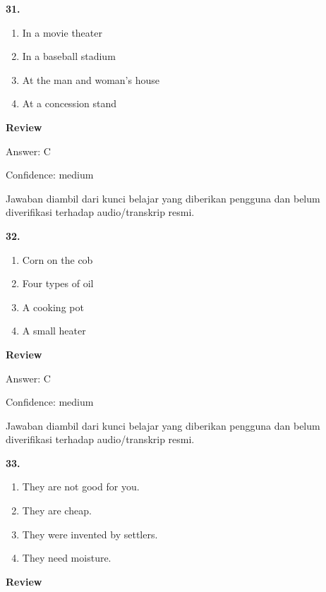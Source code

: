 \documentclass[12pt]{article}
\begin{document}
\noindent\textbf{31.}
\begin{enumerate}[label=(\Alph*),leftmargin=*,itemsep=0.2em]
\item In a movie theater
\item In a baseball stadium
\item At the man and woman's house
\item At a concession stand
\end{enumerate}
\par
\begingroup
\setlength{\parskip}{0pt}
\setlength{\parindent}{0pt}
\textbf{Review}\par
Answer: C\par
Confidence: medium\par
Jawaban diambil dari kunci belajar yang diberikan pengguna dan belum diverifikasi terhadap audio/transkrip resmi.\par
\endgroup
\par
\vspace{0.25\baselineskip}
\noindent\textbf{32.}
\begin{enumerate}[label=(\Alph*),leftmargin=*,itemsep=0.2em]
\item Corn on the cob
\item Four types of oil
\item A cooking pot
\item A small heater
\end{enumerate}
\par
\begingroup
\setlength{\parskip}{0pt}
\setlength{\parindent}{0pt}
\textbf{Review}\par
Answer: C\par
Confidence: medium\par
Jawaban diambil dari kunci belajar yang diberikan pengguna dan belum diverifikasi terhadap audio/transkrip resmi.\par
\endgroup
\par
\vspace{0.25\baselineskip}
\noindent\textbf{33.}
\begin{enumerate}[label=(\Alph*),leftmargin=*,itemsep=0.2em]
\item They are not good for you.
\item They are cheap.
\item They were invented by settlers.
\item They need moisture.
\end{enumerate}
\par
\begingroup
\setlength{\parskip}{0pt}
\setlength{\parindent}{0pt}
\textbf{Review}\par
\end{document}
